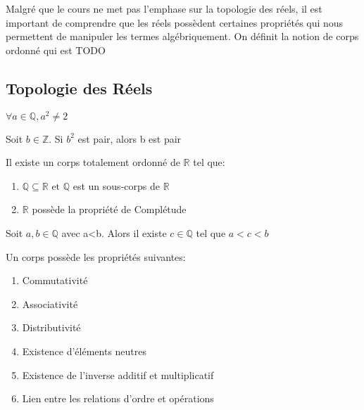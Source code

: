 \documentclass{article}
\begin{document}
Malgré que le cours ne met pas l'emphase sur la topologie des réels, il est
important de comprendre que les réels possèdent certaines propriétés qui nous
permettent de manipuler les termes algébriquement. On définit la notion de
corps ordonné qui est TODO

\subsection{Topologie des Réels}

\begin{proposition}
    $\forall a \in \mathbb{Q}, a^2 \neq 2$
\end{proposition}

\begin{lemma}
    Soit $b \in \mathbb{Z}$. Si $b^2$ est pair, alors b est pair
\end{lemma}

\begin{axiom}
    Il existe un corps totalement ordonné de $\mathbb{R}$ tel que:\\
    \begin{enumerate}
	\item $\mathbb{Q} \subseteq \mathbb{R} \text{ et } \mathbb{Q}$ est un sous-corps
	    de $\mathbb{R}$
	\item $\mathbb{R}$ possède la propriété de Complétude
    \end{enumerate}
\end{axiom}

\begin{proposition}
    Soit $a,b \in \mathbb{Q}$ avec a<b. Alors il existe $c \in \mathbb{Q}$ tel que
    $a<c<b$
\end{proposition}

\begin{theorem}
    Un corps possède les propriétés suivantes:\\
    \begin{enumerate}
	\item Commutativité
	\item Associativité
	\item Distributivité
	\item Existence d'éléments neutres
	\item Existence de l'inverse additif et multiplicatif
	\item Lien entre les relations d'ordre et opérations
    \end{enumerate}
\end{theorem}
\end{document}
